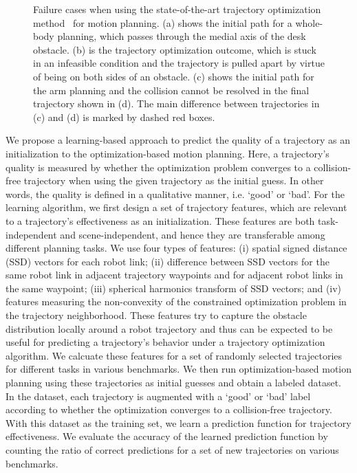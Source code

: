 \documentclass[letterpaper, 10 pt, conference]{ieeeconf}  %
\begin{document}
\begin{figure}[!h]
\caption{Failure cases when using the state-of-the-art trajectory optimization method~\cite{Schulman:2013:FLO} for motion planning. (a) shows the initial path for a whole-body planning, which passes through the medial axis of the desk obstacle. (b) is the trajectory optimization outcome, which is stuck in an infeasible condition and the trajectory is pulled apart by virtue of being on both sides of an obstacle. (c) shows the initial path for the arm planning and the collision cannot be resolved in the final trajectory shown in (d). The main difference between trajectories in (c) and (d) is marked by dashed red boxes.}
\label{fig:failexamples}
\end{figure}



We propose a learning-based approach to predict the quality of a trajectory as an initialization to the optimization-based motion planning. Here, a trajectory's quality is measured by whether the optimization problem converges to a collision-free trajectory when using the given trajectory as the initial guess. In other words, the quality is defined in a qualitative manner, i.e. `good' or `bad'.
For the learning algorithm, we first design a set of trajectory features, which are relevant to a trajectory's effectiveness as an initialization. These features are both task-independent and scene-independent, and hence they are transferable among different planning tasks. We use four types of features: (i) spatial signed distance (SSD) vectors for each robot link; (ii) difference between SSD vectors for the same robot link in adjacent trajectory waypoints and for adjacent robot links in the same waypoint; (iii) spherical harmonics transform of SSD vectors; and (iv) features measuring the non-convexity of the constrained optimization problem in the trajectory neighborhood. These features try to capture the obstacle distribution locally around a robot trajectory and thus can be expected to be useful for predicting a trajectory's behavior under a trajectory optimization algorithm. We calcuate these features for a set of randomly selected trajectories for different tasks in various benchmarks. We then run optimization-based motion planning using these trajectories as initial guesses and obtain a labeled dataset. In the dataset, each trajectory is augmented with a `good' or `bad' label according to whether the optimization converges to a collision-free trajectory. With this dataset as the training set, we learn a prediction function for trajectory effectiveness. We evaluate the accuracy of the learned prediction function by counting the ratio of correct predictions for a set of new trajectories on various benchmarks.
\end{document}

